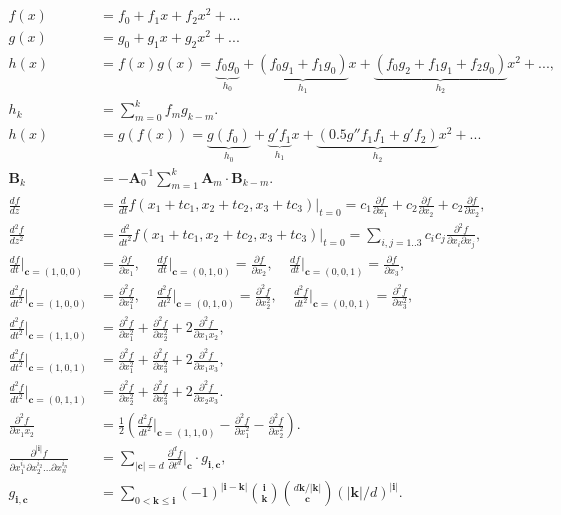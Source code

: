 \documentclass[10pt]{article}
\begin{document}
\begin{align*}f(x) &= f_0 + f_1x + f_2x^2 + ... \\
g(x) &= g_0 + g_1x + g_2x^2 + ... \\
h(x) &= f(x)g(x) = \underbrace{f_0g_0}_{h_0} + \underbrace{(f_0g_1+f_1g_0)}_{h_1}x + \underbrace{(f_0g_2 + f_1g_1 + f_2g_0)}_{h_2}x^2 + ..., \\
h_k &= \sum_{m=0}^k  f_m g_{k-m}. \\
h(x) &= g(f(x)) = \underbrace{g(f_0)}_{h_0} + \underbrace{g'f_1}_{h_1}x + \underbrace{(0.5 g''f_1 f_1 + g'f_2)}_{h_2}x^2 + ... \\
\mathbf{B}_k &=- \mathbf{A}_0^{-1}\sum_{m=1}^{k} \mathbf{A}_{m} \cdot \mathbf{B}_{k-m}. \\
\frac{df}{dz} &= \frac{d}{dt}f(x_1+tc_1,x_2+tc_2,x_3+tc_3)\Big|_{t=0} = c_1 \frac{\partial f}{\partial x_1} + c_2 \frac{\partial f}{\partial x_2} + c_2 \frac{\partial f}{\partial x_2}, \\
\frac{d^2f}{dz^2} &=\frac{d^2}{dt^2}f(x_1+tc_1,x_2+tc_2,x_3+tc_3)\Big|_{t=0} = \sum_{i,j=1..3} c_i c_j \frac{\partial^2f}{\partial x_i\partial x_j}, \\
\frac{df}{dt}\Big|_{\mathbf{c}=(1,0,0)} &= \frac{\partial f}{\partial x_1},~~~~~
\frac{df}{dt}\Big|_{\mathbf{c}=(0,1,0)} = \frac{\partial f}{\partial x_2},~~~~~
\frac{df}{dt}\Big|_{\mathbf{c}=(0,0,1)} = \frac{\partial f}{\partial x_3}, \\
\frac{d^2f}{dt^2}\Big|_{\mathbf{c}=(1,0,0)} &= \frac{\partial^2 f}{\partial x_1^2},~~~~~
\frac{d^2f}{dt^2}\Big|_{\mathbf{c}=(0,1,0)} = \frac{\partial^2 f}{\partial x_2^2},~~~~~
\frac{d^2f}{dt^2}\Big|_{\mathbf{c}=(0,0,1)} = \frac{\partial^2 f}{\partial x_3^2}, \\
\frac{d^2f}{dt^2}\Big|_{\mathbf{c}=(1,1,0)} &= \frac{\partial^2 f}{\partial x_1^2}+\frac{\partial^2 f}{\partial x_2^2}+2\frac{\partial^2 f}{\partial x_1x_2}, \\
\frac{d^2f}{dt^2}\Big|_{\mathbf{c}=(1,0,1)} &= \frac{\partial^2 f}{\partial x_1^2}+\frac{\partial^2 f}{\partial x_3^2}+2\frac{\partial^2 f}{\partial x_1x_3}, \\
\frac{d^2f}{dt^2}\Big|_{\mathbf{c}=(0,1,1)} &= \frac{\partial^2 f}{\partial x_2^2}+\frac{\partial^2 f}{\partial x_3^2}+2\frac{\partial^2 f}{\partial x_2x_3}. \\
\frac{\partial^2 f}{\partial x_1x_2} &= \frac{1}{2}\left(\frac{d^2f}{dt^2}\Big|_{\mathbf{c}=(1,1,0)} - \frac{\partial^2 f}{\partial x_1^2}-\frac{\partial^2 f}{\partial x_2^2}\right). \\
\frac{\partial^{|\mathbf{i}|} f}{\partial x_1^{i_1}\partial x_2^{i_2}...\partial x_n^{i_n}} &= \sum_{|\mathbf{c}|=d}\frac{\partial^d f}{\partial t^d}\Big|_{\mathbf{c}}\cdot g_{\mathbf{i},\mathbf{c}}, \\
g_{\mathbf{i},\mathbf{c}} &= \sum_{0<\mathbf{k}\leq\mathbf{i}}(-1)^{|\mathbf{i}-\mathbf{k}|}{\mathbf{i}\choose\mathbf{k}}{d\mathbf{k}/|\mathbf{k}|\choose\mathbf{c}}\left(|\mathbf{k}|/d\right)^{|\mathbf{i}|}.
\end{align*}
\end{document}
